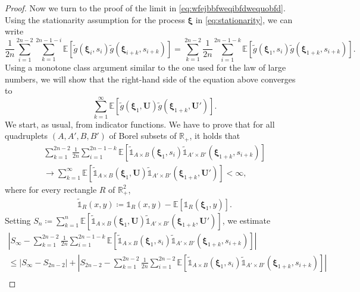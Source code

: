 \documentclass[11pt,a4paper,oneside]{article}
\theoremstyle{definition}
\theoremstyle{remark}
\def\E{\mathbb{E}}
\def\R{\mathbb{R}}
\begin{document}
\begin{proof}
	Now we turn to the proof of the limit in \cref{eq:wfejbbfweqibfdwequobfd}. Using the stationarity assumption for the process $\bm\xi$ in \cref{eq:stationarity}, we can write
	\begin{equation}
		\frac{1}{2n} \sum_{i=1}^{2n-2} \sum_{k=1}^{2n-1 -i} \E \left[ \tilde{g} \left(\bm \xi_i,s_i\right) \tilde{g} \left(\bm \xi_{i+k},s_{i+k}\right)  \right] 
		=  \sum_{k=1}^{2n-2}  	\frac{1}{2n} \sum_{i=1}^{2n-1-k}  \E \left[  \tilde{g} \left(\bm \xi_1,s_i\right) \tilde{g} \left(\bm \xi_{1+k},s_{i+k}\right)  \right].
	\end{equation}
	Using a monotone class argument similar to the one used for the law of large numbers, we will show that the right-hand side of the equation above converges to 
	\begin{equation}
	 \sum_{k=1}^{\infty} \E\left[ \tilde{g} (\bm{\xi}_1, \bm U) \tilde{g}  (\bm{\xi}_{1+k}, \bm U') \right].
	\end{equation}
	We start, as usual, from indicator functions. We have to prove that for all quadruplets $(A,A',B,B')$ of Borel subsets of $\R_+$, it holds that
	\begin{multline}\label{eq:dim_for_ind_fct_centered}
 	\sum_{k=1}^{2n-2}  	\frac{1}{2n} \sum_{i=1}^{2n-1-k}  \E \left[ \tilde{\mathds{1}}_{A \times B}\left(\bm \xi_1,s_i\right)  
 	\tilde{\mathds{1}}_{A' \times B'}\left(\bm \xi_{1+k},s_{i+k}\right) \right] \\
	 \to 
	 \sum_{k=1}^{\infty} \E\left[ \tilde {\mathds{1}}_{A \times B}(\bm{\xi}_1, \bm U)   \tilde {\mathds{1}}_{A' \times B'} (\bm{\xi}_{1+k}, \bm U') \right] <\infty,
\end{multline}
	where for every rectangle $R$ of $\R_+^2$,
\begin{align}
	\tilde{\mathds{1}}_{R}\left(x,y\right)\coloneqq\mathds{1}_{R}\left(x,y\right)-\E\left[ \mathds{1}_{R}\left(\bm \xi_1,y\right) \right].
		\end{align}
	Setting $S_n\coloneqq\sum_{k=1}^{n}\E\left[ \tilde {\mathds{1}}_{A \times B}(\bm{\xi}_1, \bm U)   \tilde {\mathds{1}}_{A' \times B'} (\bm{\xi}_{1+k}, \bm U') \right]$, we estimate
		\begin{multline}\label{eq:rehbgre0uq-9grg}
	\left|	S_{\infty} -  
	\sum_{k=1}^{2n-2}  	\frac{1}{2n} \sum_{i=1}^{2n-1-k}  \E \left[ \tilde{\mathds{1}}_{A \times B}\left(\bm \xi_1,s_i\right) \tilde{\mathds{1}}_{A' \times B'}\left(\bm \xi_{1+k},s_{i+k}\right)  \right] 	\right| \\
	\leq \left| S_{\infty}-S_{2n-2}\right| 
	+  \left|	S_{2n-2} - 
	\sum_{k=1}^{2n-2}  	\frac{1}{2n} \sum_{i=1}^{2n-2}  \E \left[ \tilde{\mathds{1}}_{A \times B}\left(\bm \xi_1,s_i\right) \tilde{\mathds{1}}_{A' \times B'}\left(\bm \xi_{1+k},s_{i+k}\right)  \right] 	\right| \\

\end{multline}
\end{proof}
\end{document}
